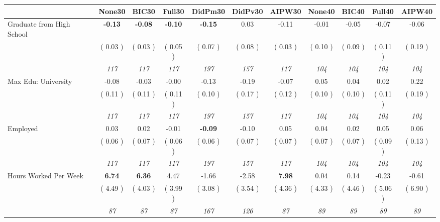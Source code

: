 \begin{tabular}{l c c c c c c c c c c}
\toprule
 & None30 & BIC30 & Full30 & DidPm30 & DidPv30 & AIPW30 & None40 & BIC40 & Full40 & AIPW40 \\
\midrule
Graduate from High School & \textbf{     -0.13 } & \textbf{     -0.08 } & \textbf{     -0.10 } & \textbf{     -0.15 } &      0.03 &     -0.11 &     -0.01 &     -0.05 &     -0.07 &     -0.06 \\
& (     0.03 ) & (     0.03 ) & (     0.05 ) & (     0.07 ) & (     0.08 ) & (     0.03 ) & (     0.10 ) & (     0.09 ) & (     0.11 ) & (     0.19 ) \\
& \textit{ 117 } & \textit{ 117 } & \textit{ 117 } & \textit{ 197 } & \textit{ 157 } & \textit{ 117 } & \textit{ 104 } & \textit{ 104 } & \textit{ 104 } & \textit{ 104 } \\
Max Edu: University &     -0.08 &     -0.03 &     -0.00 &     -0.13 &     -0.19 &     -0.07 &      0.05 &      0.04 &      0.02 &      0.22 \\
& (     0.11 ) & (     0.11 ) & (     0.11 ) & (     0.10 ) & (     0.17 ) & (     0.12 ) & (     0.10 ) & (     0.10 ) & (     0.11 ) & (     0.19 ) \\
& \textit{ 117 } & \textit{ 117 } & \textit{ 117 } & \textit{ 197 } & \textit{ 157 } & \textit{ 117 } & \textit{ 104 } & \textit{ 104 } & \textit{ 104 } & \textit{ 104 } \\
Employed &      0.03 &      0.02 &     -0.01 & \textbf{     -0.09 } &     -0.10 &      0.05 &      0.04 &      0.02 &      0.05 &      0.06 \\
& (     0.06 ) & (     0.07 ) & (     0.06 ) & (     0.06 ) & (     0.07 ) & (     0.07 ) & (     0.07 ) & (     0.07 ) & (     0.09 ) & (     0.13 ) \\
& \textit{ 117 } & \textit{ 117 } & \textit{ 117 } & \textit{ 197 } & \textit{ 157 } & \textit{ 117 } & \textit{ 104 } & \textit{ 104 } & \textit{ 104 } & \textit{ 104 } \\
Hours Worked Per Week & \textbf{      6.74 } & \textbf{      6.36 } &      4.47 &     -1.66 &     -2.58 & \textbf{     7.98} &      0.04 &      0.14 &     -0.23 &     -0.61 \\
& (     4.49 ) & (     4.03 ) & (     3.99 ) & (     3.08 ) & (     3.54 ) & (     4.36 ) & (     4.33 ) & (     4.46 ) & (     5.06 ) & (     6.90 ) \\
& \textit{ 87 } & \textit{ 87 } & \textit{ 87 } & \textit{ 167 } & \textit{ 126 } & \textit{ 87 } & \textit{ 89 } & \textit{ 89 } & \textit{ 89 } & \textit{ 89 } \\

\end{tabular}
